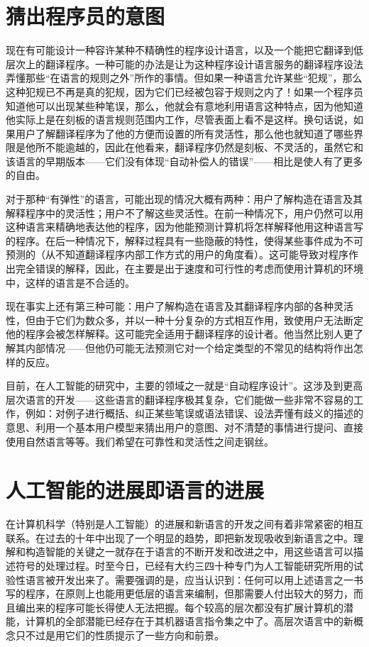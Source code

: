 \section{猜出程序员的意图}

现在有可能设计一种容许某种不精确性的程序设计语言，以及一个能把它翻译到低层次上的翻译程序。一种可能的办法是让为这种程序设计语言服务的翻译程序设法弄懂那些“在语言的规则之外”所作的事情。但如果一种语言允许某些“犯规”，那么这种犯规已不再是真的犯规，因为它们已经被包容于规则之内了！如果一个程序员知道他可以出现某些种笔误，那么，他就会有意地利用语言这种特点，因为他知道他实际上是在刻板的语言规则范围内工作，尽管表面上看不是这样。换句话说，如果用户了解翻译程序为了他的方便而设置的所有灵活性，那么他也就知道了哪些界限是他所不能逾越的，因此在他看来，翻译程序仍然是刻板、不灵活的，虽然它和该语言的早期版本——它们没有体现“自动补偿人的错误”——相比是使人有了更多的自由。

对于那种“有弹性”的语言，可能出现的情况大概有两种：用户了解构造在语言及其解释程序中的灵活性；用户不了解这些灵活性。在前一种情况下，用户仍然可以用这种语言来精确地表达他的程序，因为他能预测计算机将怎样解释他用这种语言写的程序。在后一种情况下，解释过程具有一些隐蔽的特性，使得某些事件成为不可预测的（从不知道翻译程序内部工作方式的用户的角度看）。这可能导致对程序作出完全错误的解释，因此，在主要是出于速度和可行性的考虑而使用计算机的环境中，这样的语言是不合适的。

现在事实上还有第三种可能：用户了解构造在语言及其翻译程序内部的各种灵活性，但由于它们为数众多，并以一种十分复杂的方式相互作用，致使用户无法断定他的程序会被怎样解释。这可能完全适用于翻译程序的设计者。他当然比别人更了解其内部情况——但他仍可能无法预测它对一个给定类型的不常见的结构将作出怎样的反应。

目前，在人工智能的研究中，主要的领域之一就是“自动程序设计”。这涉及到更高层次语言的开发——这些语言的翻译程序极其复杂，它们能做一些非常不容易的工作，例如：对例子进行概括、纠正某些笔误或语法错误、设法弄懂有歧义的描述的意思、利用一个基本用户模型来猜出用户的意图、对不清楚的事情进行提问、直接使用自然语言等等。我们希望在可靠性和灵活性之间走钢丝。

\section{人工智能的进展即语言的进展}

在计算机科学（特别是人工智能）的进展和新语言的开发之间有着非常紧密的相互联系。在过去的十年中出现了一个明显的趋势，即把新发现吸收到新语言之中。理解和构造智能的关键之一就存在于语言的不断开发和改进之中，用这些语言可以描述符号的处理过程。时至今日，已经有大约三四十种专门为人工智能研究所用的试验性语言被开发出来了。需要强调的是，应当认识到：任何可以用上述语言之一书写的程序，在原则上也能用更低层的语言来编制，但那需要人付出较大的努力，而且编出来的程序可能长得使人无法把握。每个较高的层次都没有扩展计算机的潜能，计算机的全部潜能已经存在于其机器语言指令集之中了。高层次语言中的新概念只不过是用它们的性质提示了一些方向和前景。

